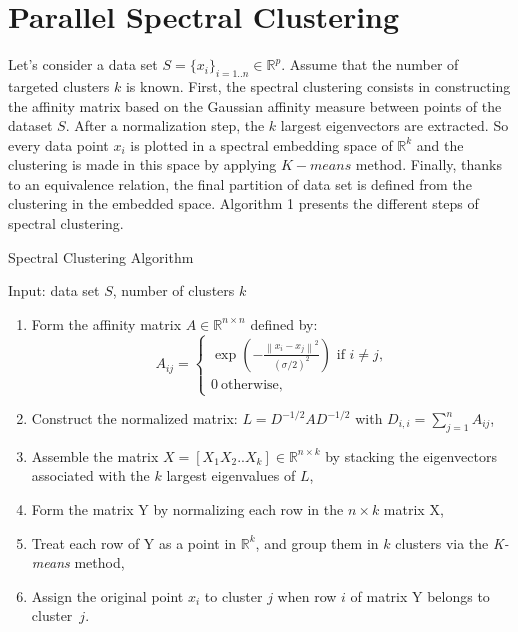\documentclass{llncs}
\begin{document}
\section{Parallel Spectral Clustering}
%

Let's consider a data set $S=\{x_i\}_{i=1..n}\in \mathbb{R}^p$. Assume that the
number of targeted clusters $k$ is known. First, the spectral clustering
consists in constructing the affinity matrix based on the Gaussian affinity
measure between points of the dataset $S$.
After a normalization step, the $k$ largest eigenvectors are extracted. So
every data point $x_i$ is plotted in a spectral embedding space of
$\mathbb{R}^k$ and the clustering is made in this space by applying $K-means$
method. Finally, thanks to an equivalence relation, the final partition of
data set is defined from the clustering in the embedded space. Algorithm 1
presents the different steps of spectral clustering.
\begin{algorithm}
\caption{Spectral Clustering Algorithm}
Input: data set $S$, number of clusters $k$
\begin{enumerate}
\item Form the affinity matrix $A\in\mathbb{R}^{n\times n}$ defined by:
\begin{equation}
A_{ij}=\begin{cases}
\exp\left(-\frac{\left\|x_i-x_j\right\|^2}{(\sigma/2)^2}\right) \text{\  if $i\neq j$,}\\ \label{defaff}
0 \ \text{otherwise,}
\end{cases}
\end{equation}
\item Construct the normalized matrix: $L=D^{-1/2}AD^{-1/2}$ with $D_{i,i}=\sum_{j=1}^n A_{ij}$,
\item Assemble the matrix $X=[X_1X_2..X_k]\in \mathbb{R}^{n\times k}$ by stacking the eigenvectors associated with the {$k$} largest eigenvalues of $L$,
\item Form the matrix Y by normalizing each row in the $n \times k$ matrix X,
\item Treat each row of Y as a point in $\mathbb{R}^{k}$, and group them in $k$ clusters via the {\it K-means} method,
\item Assign the original point $x_i$ to cluster $j$ when row $i$ of matrix Y belongs to cluster~$j$. 
\end{enumerate}
\label{algo}
\end{algorithm}
\end{document}
